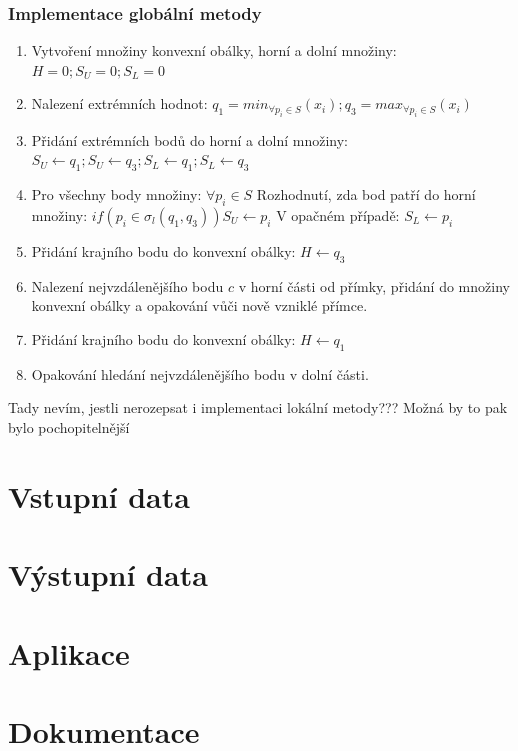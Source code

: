 \documentclass[a4paper, 12pt]{article}
\begin{document}
\subsubsection{Implementace globální metody}
\begin{enumerate}
\item Vytvoření množiny konvexní obálky, horní a dolní množiny:  $H = 0; S_U = 0; S_L = 0 $ 
\item Nalezení extrémních hodnot:  $ q_1 =  min_{\forall p_i \in S}(x_i); q_3 =  max_{\forall p_i \in S}(x_i) $ 
\item Přidání extrémních bodů do horní a dolní množiny: $S_U \leftarrow q_1; S_U \leftarrow q_3; S_L \leftarrow q_1; S_L \leftarrow q_3 $
\item Pro všechny body množiny: $\forall p_i \in S  $
\subitem Rozhodnutí, zda bod patří do horní množiny: $ if(p_i \in \sigma_l(q_1, q_3)) S_U \leftarrow p_i  $
\subitem V opačném případě: $ S_L \leftarrow p_i  $
\item Přidání krajního bodu do konvexní obálky: $H \leftarrow q_3$
\item Nalezení nejvzdálenějšího bodu $c$ v horní části od přímky, přidání do množiny konvexní obálky a opakování vůči nově vzniklé přímce.
\item Přidání krajního bodu do konvexní obálky: $H \leftarrow q_1$
\item Opakování hledání nejvzdálenějšího bodu v dolní části.
\end{enumerate}

Tady nevím, jestli nerozepsat i implementaci lokální metody??? Možná by to pak bylo pochopitelnější

\section{Vstupní data}


\section{Výstupní data}


\section{Aplikace}



\section{Dokumentace}
\end{document}
